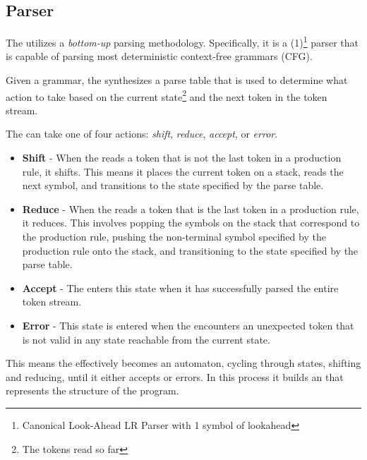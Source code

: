\subsection{Parser}

The \lang{} \parser{} utilizes a \textit{bottom-up} parsing methodology.
Specifically, it is a \parserType{}(1)\footnote{Canonical Look-Ahead LR Parser with 1
symbol of lookahead} parser that is capable of parsing most deterministic
context-free grammars (CFG).

Given a grammar, the \parser{} synthesizes a parse table that is used to
determine what action to take based on the current state\footnote{The tokens
read so far} and the next token in the token stream. 

The \parser{} can take one of four actions: \textit{shift}, \textit{reduce},
\textit{accept}, or \textit{error}. 

\begin{itemize} 
  
  \item \textbf{Shift} - When the \parser{} reads a token that is not the last token
    in a production rule, it shifts. This means it places the current token on a
    stack, reads the next symbol, and transitions to the state specified by the parse
    table.

  \item \textbf{Reduce} - When the \parser{} reads a token that is the last token in
    a production rule, it reduces. This involves popping the symbols on the stack
    that correspond to the production rule, pushing the non-terminal symbol specified
    by the production rule onto the stack, and transitioning to the state specified
    by the parse table.

  \item \textbf{Accept} - The \parser{} enters this state when it has successfully
    parsed the entire token stream.

  \item \textbf{Error} - This state is entered when the \parser{} encounters an
    unexpected token that is not valid in any state reachable from the current state.

\end{itemize}

This means the \parser{} effectively becomes an automaton, cycling through states,
shifting and reducing, until it either accepts or errors. In this process it builds an
\ast{} that represents the structure of the program.


